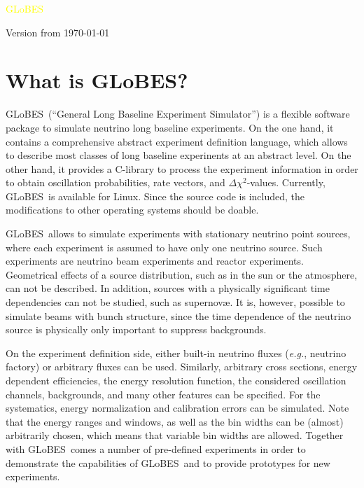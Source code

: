 \documentclass[a4paper,12pt,twoside]{book}
\newcommand{\eg}{{\it e.g.}}
\newcommand{\GLOBES}{{\sf GLoBES}}
\begin{document}
{\begin{center}
\vspace*{-1cm}

{\Huge \textcolor{yellow}{GLoBES}}
\end{center}

\vspace{1cm}

\begin{center}
Version from \today
\end{center}



}

\clearpage
\thispagestyle{empty}

\cleardoublepage
\setcounter{page}{1}

\chapter*{What is \GLOBES ?}

\GLOBES\ (``General Long Baseline Experiment Simulator'') is a flexible
software package to simulate neutrino long baseline experiments. On the
one hand, it contains a comprehensive abstract experiment definition
language, which allows to describe most classes of long baseline experinents
at an abstract level. On the other hand, it provides a C-library to 
process the experiment information in order to obtain oscillation
probabilities, rate vectors, and $\Delta \chi^2$-values. Currently, 
\GLOBES\ is available for Linux. Since the source code is included,
the modifications to other operating systems should be doable.

\GLOBES\ allows to simulate experiments with stationary neutrino point sources, where each experiment is assumed to have only one neutrino source.
Such experiments are neutrino beam experiments and reactor experiments. 
Geometrical effects of a source distribution, such as in the sun or the 
atmosphere, can not be described. In addition, sources with a physically 
significant time dependencies  can not be studied, such as  supernov\ae. It 
is, however, possible to simulate beams with bunch structure, since the 
time dependence of the neutrino source is physically only important to suppress backgrounds. 

On the experiment definition side, either built-in neutrino fluxes
(\eg, neutrino factory) or arbitrary fluxes can be used. Similarly,
arbitrary cross sections, energy dependent efficiencies, the
energy resolution function, the considered oscillation channels, 
backgrounds, and many other features can be specified. 
For the systematics, energy
normalization and calibration errors can be simulated. Note that
the energy ranges and windows, as well as the bin widths can be
(almost) arbitrarily chosen, which means that variable bin
widths are allowed. Together with \GLOBES\ comes a number of
pre-defined experiments in order to demonstrate the capabilities
of \GLOBES\ and to provide prototypes for new experiments.
\end{document}
